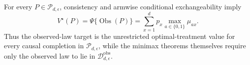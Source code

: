 For every \(P\in\mathcal P_{d,\epsilon}\), consistency and armwise conditional exchangeability imply
\[
 V^\star(P)=\Psi\{\operatorname{Obs}(P)\}
 =\sum_{x=1}^d p_x\max_{a\in\{0,1\}}\mu_{ax}.
\]
Thus the observed-law target is the unrestricted optimal-treatment value for every causal completion in \(\mathcal P_{d,\epsilon}\), while the minimax theorems themselves require only the observed law to lie in \(\mathcal D_{d,\epsilon}^{\mathrm{obs}}\).